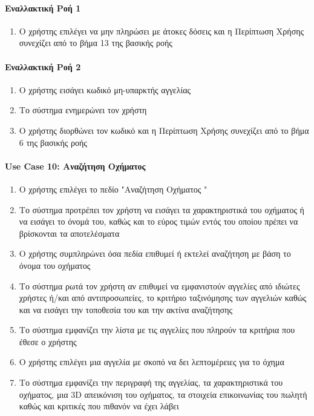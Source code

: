 \documentclass{../ol-softwaremanual}
\begin{document}
	\paragraph{Εναλλακτική Ροή 1}
	\begin{enumerate}
		\item Ο χρήστης επιλέγει να μην πληρώσει με άτοκες δόσεις και η Περίπτωση Χρήσης συνεχίζει από το βήμα 13 της βασικής ροής
	\end{enumerate}
	
	\paragraph{Εναλλακτική Ροή 2}
	\begin{enumerate}
		\item Ο χρήστης εισάγει κωδικό μη-υπαρκτής αγγελίας
		\item Το σύστημα ενημερώνει τον χρήστη
		\item Ο χρήστης διορθώνει τον κωδικό και η Περίπτωση Χρήσης συνεχίζει από το βήμα 6 της βασικής ροής
	\end{enumerate}
	
	\paragraph{\en Use Case 10: \gr Αναζήτηση Οχήματος}  
	\begin{enumerate}
		\item Ο χρήστης επιλέγει το πεδίο \en"\gr Αναζήτηση Οχήματος \en"\gr
		\item Το σύστημα προτρέπει τον χρήστη να εισάγει τα χαρακτηριστικά του οχήματος ή να εισάγει το όνομά του, καθώς και το εύρος τιμών εντός του οποίου πρέπει να βρίσκονται τα αποτελέσματα
		\item Ο χρήστης συμπληρώνει όσα πεδία επιθυμεί ή εκτελεί αναζήτηση με βάση το όνομα του οχήματος
		\item Το σύστημα ρωτά τον χρήστη αν επιθυμεί να εμφανιστούν αγγελίες από ιδιώτες χρήστες ή/και από αντιπροσωπείες, το κριτήριο ταξινόμησης των αγγελιών καθώς και να εισάγει την τοποθεσία του και την ακτίνα αναζήτησης		
		\item Το σύστημα εμφανίζει την λίστα με τις αγγελίες που πληρούν τα κριτήρια που έθεσε ο χρήστης	
		\item Ο χρήστης επιλέγει μια αγγελία με σκοπό να δει λεπτομέρειες για το όχημα
		\item Το σύστημα εμφανίζει την περιγραφή της αγγελίας, τα χαρακτηριστικά του οχήματος, μια \en 3D \gr απεικόνιση του οχήματος, τα στοιχεία επικοινωνίας του πωλητή καθώς και κριτικές που πιθανόν να έχει λάβει		
	\end{enumerate}
	
\end{document}
